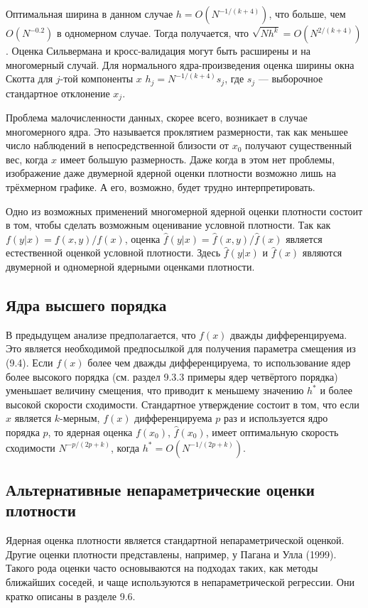 Оптимальная ширина в данном случае $h = O(N^{-1/(k+4)})$, что больше, чем $O(N^{-0.2})$ в одномерном случае. Тогда получается, что $\sqrt{Nh^k} = O(N^{2/(k+4)})$. Оценка Сильвермана и кросс-валидация могут быть расширены и на многомерный случай. Для нормального ядра-произведения  оценка ширины окна Скотта для $j$-той компоненты $x$ $h_j = N^{-1/(k+4)}s_j$, где $s_j$ --- выборочное стандартное отклонение $x_j$. 

Проблема малочисленности данных, скорее всего, возникает в случае многомерного ядра. Это называется проклятием размерности, так как меньшее число наблюдений в непосредственной близости от $x_0$ получают существенный вес, когда $x$ имеет большую размерность. Даже когда в этом нет проблемы, изображение даже двумерной ядерной оценки плотности возможно лишь на трёхмерном графике. А его, возможно, будет трудно интерпретировать.

Одно из возможных применений многомерной ядерной оценки плотности состоит в том, чтобы сделать возможным оценивание условной плотности. Так как $f(y|x) = f(x,y)/f(x)$, оценка $\hat{f}(y|x) = \hat{f}(x,y)/\hat{f}(x)$ является естественной оценкой условной плотности. Здесь $\hat{f}(y|x)$ и $\hat{f}(x)$ являются двумерной и одномерной ядерными оценками плотности.

\subsection{Ядра высшего порядка}

В предыдущем анализе предполагается, что $f(x)$ дважды дифференцируема. Это является необходимой предпосылкой для получения параметра смещения из (9.4). Если $f(x)$ более чем дважды дифференцируема, то использование ядер более высокого порядка (см. раздел 9.3.3 примеры ядер четвёртого порядка) уменьшает величину смещения, что приводит к меньшему значению $h^*$ и более высокой скорости сходимости. Стандартное утверждение состоит в том, что если $x$ является $k$-мерным, $f(x)$ дифференцируема $p$ раз и используется ядро порядка $p$, то ядерная оценка $f(x_0)$, $\hat{f}(x_0)$, имеет оптимальную скорость сходимости $N^{-p/(2p+k)}$, когда $h^* = O(N^{-1/(2p+k)})$.

\subsection{Альтернативные непараметрические оценки плотности}

Ядерная оценка плотности является стандартной непараметрической оценкой. Другие оценки плотности представлены, например, у Пагана и Улла (1999). Такого рода оценки часто основываются на подходах таких, как методы ближайших соседей, и чаще используются в непараметрической регрессии. Они кратко описаны в разделе 9.6.

